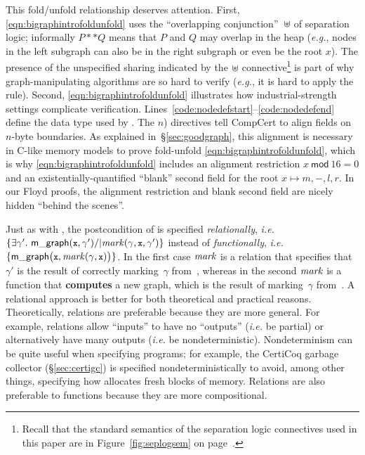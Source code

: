 This fold/unfold relationship deserves attention.
First, \eqref{eqn:bigraphintrofoldunfold} uses the ``overlapping conjunction''~$\ocon$ of separation logic; informally $P ** Q$ means that $P$ and $Q$ may overlap
in the heap (\emph{e.g.}, nodes in the left subgraph can also be in the right subgraph
or even be the root $x$).  The presence of the unspecified sharing indicated by the
$\ocon$ connective\footnote{Recall that the
standard semantics of the separation logic connectives used in this paper are in
Figure~\ref{fig:seplogsem} on page~\pageref{fig:seplogsem}.} is part of why graph-manipulating algorithms are so hard to verify
(\emph{e.g.}, it is hard to apply the  rule).
Second, \eqref{eqn:bigraphintrofoldunfold} illustrates how industrial-strength settings complicate verification.  Lines~\mbox{\ref{code:nodedefstart}--\ref{code:nodedefend}} define the data type  used by .  The $n${)} directives tell CompCert to align fields on $n$-byte boundaries.
As explained in~\S\ref{sec:goodgraph}, this alignment is necessary in C-like memory models to prove fold-unfold \eqref{eqn:bigraphintrofoldunfold}, which is why \eqref{eqn:bigraphintrofoldunfold} includes an alignment restriction $x~\mathsf{mod}~16 = 0$ and an existentially-quantified ``blank'' second field for the root $x \mapsto m,-,l,r$.
In our Floyd proofs, the alignment restriction and blank second field are nicely hidden ``behind the scenes''.

Just as with , the postcondition of  is specified \emph{relationally}, \emph{i.e.} $\{\exists \gamma'.~ \p{m\_graph}(\li{x},\gamma') /| \m{mark}(\gamma, \li{x}, \gamma')\}$ instead of \emph{functionally}, \emph{i.e.} $\{\mathsf{m\_graph}\big({\texttt{\small x}},\mathit{mark}(\gamma, {\texttt{\small x}})\big)\}$. In the first case $\mathit{mark}$ is a relation that specifies that~$\gamma'$ is the result of correctly marking~$\gamma$ from~, whereas in the second $\mathit{mark}$ is a function that \textbf{computes} a new graph, which is the result of marking~$\gamma$ from~. A relational approach is better for both theoretical and practical reasons.
Theoretically, relations are preferable because they are more general.  For example, relations allow ``inputs'' to have no ``outputs'' (\emph{i.e.} be partial) or alternatively have many outputs (\emph{i.e.} be nondeterministic).  Nondeterminism can be quite useful when specifying programs; for example, the CertiCoq garbage collector (\S\ref{sec:certigc}) is specified nondeterministically to avoid, among other things, specifying how  allocates fresh blocks of memory.  Relations are also preferable to functions because they are more compositional.

